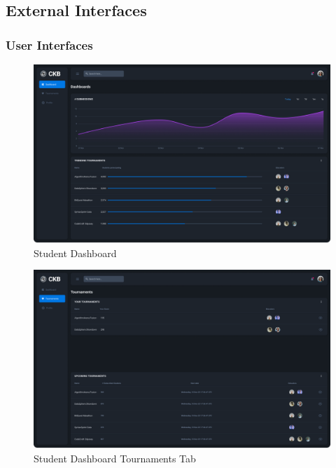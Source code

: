 \subsection{External Interfaces}
\subsubsection{User Interfaces}

\begin{figure}[H]
    \centering
    \includegraphics[width=\textwidth]{Images/Dashboard-Student.png}
    \caption{Student Dashboard}
    \label{fig:student-dashboard}
\end{figure}

\begin{figure}[H]
    \centering
    \includegraphics[width=\textwidth]{Images/Dashboard-Tournament.png}
    \caption{Student Dashboard Tournaments Tab}
    \label{fig:student-dashboard-tournaments}
\end{figure}

